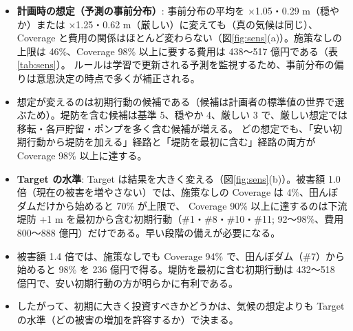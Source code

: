 \begin{itemize}
  \item \textbf{計画時の想定（予測の事前分布）}: 事前分布の平均を ×1.05・0.29 m（穏やか）または ×1.25・0.62 m（厳しい）に変えても（真の気候は同じ）、
    Coverage と費用の関係はほとんど変わらない（図\ref{fig:sens}(a)）。施策なしの上限は 46\%、Coverage 98\% 以上に要する費用は 438〜517 億円である（表\ref{tab:sens}）。
    ルールは学習で更新される予測を監視するため、事前分布の偏りは意思決定の時点で多くが補正される。
  \item 想定が変えるのは初期行動の候補である（候補は計画者の標準値の世界で選ぶため）。堤防を含む候補は基準 5、穏やか 4、厳しい 3 で、厳しい想定では移転・各戸貯留・ポンプを多く含む候補が増える。
    どの想定でも、「安い初期行動から堤防を加える」経路と「堤防を最初に含む」経路の両方が Coverage 98\% 以上に達する。
  \item \textbf{Target の水準}: Target は結果を大きく変える（図\ref{fig:sens}(b)）。被害額 1.0 倍（現在の被害を増やさない）では、施策なしの Coverage は 4\%、田んぼダムだけから始めると 70\% が上限で、
    Coverage 90\% 以上に達するのは下流堤防 +1 m を最初から含む初期行動（\#1・\#8・\#10・\#11; 92〜98\%、費用 800〜888 億円）だけである。早い段階の備えが必要になる。
  \item 被害額 1.4 倍では、施策なしでも Coverage 94\% で、田んぼダム（\#7）から始めると 98\% を 236 億円で得る。堤防を最初に含む初期行動は 432〜518 億円で、安い初期行動の方が明らかに有利である。
  \item したがって、初期に大きく投資すべきかどうかは、気候の想定よりも Target の水準（どの被害の増加を許容するか）で決まる。
\end{itemize}
